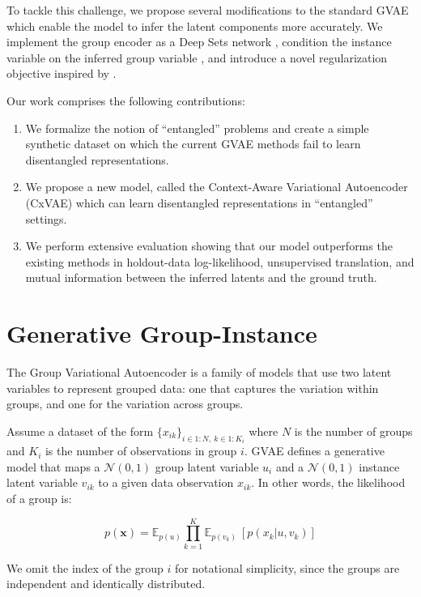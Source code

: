 \documentclass[nohyperref]{article}
\theoremstyle{plain}
\theoremstyle{definition}
\theoremstyle{remark}
\begin{document}
To tackle this challenge, we propose several modifications to the standard GVAE which enable the model to infer the latent components more accurately. We implement the group encoder as a Deep Sets network \citep{Zaheer2017DeepS}, condition the instance variable on the inferred group variable \citep{Li2018DisentangledSA}, and introduce a novel regularization objective inspired by \citep{Nmeth2020AdversarialDW}.

Our work comprises the following contributions:
\begin{enumerate}
    \item We formalize the notion of ``entangled'' problems and create a simple synthetic dataset on which the current GVAE methods fail to learn disentangled representations.
    \item We propose a new model, called the Context-Aware Variational Autoencoder (CxVAE) which can learn disentangled representations in ``entangled'' settings.
    \item We perform extensive evaluation showing that our model outperforms the existing methods in holdout-data log-likelihood, unsupervised translation, and mutual information between the inferred latents and the ground truth.
\end{enumerate}

\section{Generative Group-Instance}

The Group Variational Autoencoder \citep{Bouchacourt2018MultiLevelVA,Hosoya2019GroupbasedLO} is a family of models that use two latent variables to represent grouped data: one that captures the variation within groups, and one for the variation across groups.

Assume a dataset of the form $\{x_{ik}\}_{i \in 1:N, ~k \in 1:K_i}$ where $N$ is the number of groups and $K_i$ is the number of observations in group $i$. GVAE defines a generative model that maps a $\mathcal{N} (0,1)$ group latent variable $u_i$ and a $\mathcal{N} (0,1)$ instance latent variable $v_{ik}$ to a given data observation $x_{ik}$. In other words, the likelihood of a group is:

$$p(\mathbf{x}) = \mathbb{E}_{p(u)}  \prod_{k=1}^{K} \mathbb{E}_{p(v_{k})} ~ [p(x_{k} | u, v_{k})]$$

We omit the index of the group $i$ for notational simplicity, since the groups are independent and identically distributed.
\end{document}
